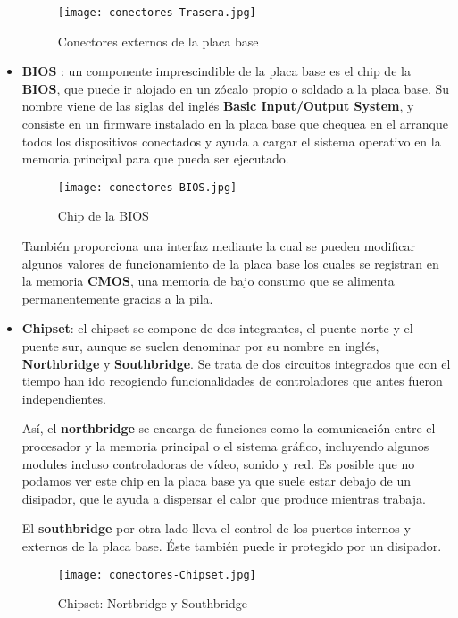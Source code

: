 \begin{itemize}
    \begin{figure}[H]
        \centering
        \texttt{[image: conectores-Trasera.jpg]}
        \caption{Conectores externos de la placa base}
    \end{figure}

    \item \textbf{BIOS }: un componente imprescindible de la placa base es el chip de la \textbf{BIOS}, que puede ir alojado en un zócalo propio o soldado a la placa base. Su nombre viene de las siglas del inglés \textbf{Basic Input/Output System}, y consiste en un firmware instalado en la placa base que chequea en el arranque todos los dispositivos conectados y ayuda a cargar el sistema operativo en la memoria principal para que pueda ser ejecutado.

    \begin{figure}[H]
        \centering
        \texttt{[image: conectores-BIOS.jpg]}
        \caption{Chip de la BIOS}
    \end{figure}

    También proporciona una interfaz mediante la cual se pueden modificar algunos valores de funcionamiento de la placa base los cuales se registran en la memoria \textbf{CMOS}, una memoria de bajo consumo que se alimenta permanentemente gracias a la pila.

    \item \textbf{Chipset}: el chipset se compone de dos integrantes, el puente norte y el puente sur, aunque se suelen denominar por su nombre en inglés, \textbf{Northbridge} y \textbf{Southbridge}. Se trata de dos circuitos integrados que con el tiempo han ido recogiendo funcionalidades de controladores que antes fueron independientes.

    Así, el \textbf{northbridge} se encarga de funciones como la comunicación entre el procesador y la memoria principal o el sistema gráfico, incluyendo algunos modules incluso controladoras de vídeo, sonido y red. Es posible que no podamos ver este chip en la placa base ya que suele estar debajo de un disipador, que le ayuda a dispersar el calor que produce mientras trabaja.

    El \textbf{southbridge} por otra lado lleva el control de los puertos internos y externos de la placa base. Éste también puede ir protegido por un disipador.

    \begin{figure}[H]
        \centering
        \texttt{[image: conectores-Chipset.jpg]}
        \caption{Chipset: Nortbridge y Southbridge}
    \end{figure}
\end{itemize}



\glsaddall
\printglossaries


\newpage
{}



